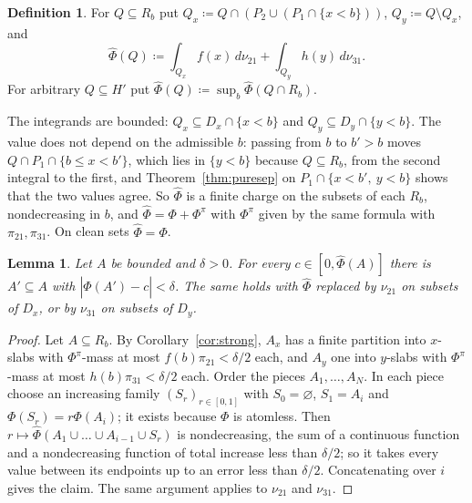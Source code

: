 \documentclass[11pt]{article}
\newtheorem{lemma}[theorem]{Lemma}
\theoremstyle{definition}\newtheorem{definition}[theorem]{Definition}
\theoremstyle{remark}\newtheorem{remark}[theorem]{Remark}
\newcommand{\Phihat}{\widehat\Phi}
\begin{document}
\begin{definition}\label{def:Phihat}
For $Q\subseteq R_b$ put $Q_x\coloneqq Q\cap(P_2\cup(P_1\cap\{x<b\}))$,
$Q_y\coloneqq Q\setminus Q_x$, and
\[
 \Phihat(Q)\coloneqq\int_{Q_x}f(x)\,d\nu_{21}+\int_{Q_y}h(y)\,d\nu_{31}.
\]
For arbitrary $Q\subseteq H'$ put $\Phihat(Q)\coloneqq\sup_b\Phihat(Q\cap
R_b)$.
\end{definition}

The integrands are bounded: $Q_x\subseteq D_x\cap\{x<b\}$ and $Q_y\subseteq
D_y\cap\{y<b\}$. The value does not depend on the admissible $b$: passing
from $b$ to $b'>b$ moves $Q\cap P_1\cap\{b\le x<b'\}$, which lies in
$\{y<b\}$ because $Q\subseteq R_b$, from the second integral to the first,
and Theorem~\ref{thm:puresep} on $P_1\cap\{x<b',\ y<b\}$ shows that the two
values agree. So $\Phihat$ is a finite charge on the subsets of each $R_b$,
nondecreasing in $b$, and $\Phihat=\Phi+\Phi^\pi$ with $\Phi^\pi$ given by the
same formula with $\pi_{21},\pi_{31}$. On clean sets $\Phihat=\Phi$.

\begin{lemma}\label{lem:ivt}
Let $A$ be bounded and $\delta>0$. For every $c\in[0,\Phihat(A)]$ there is
$A'\subseteq A$ with $|\Phihat(A')-c|<\delta$. The same holds with
$\Phihat$ replaced by $\nu_{21}$ on subsets of $D_x$, or by $\nu_{31}$ on
subsets of $D_y$.
\end{lemma}
\begin{proof}
Let $A\subseteq R_b$. By Corollary~\ref{cor:strong}, $A_x$ has a finite
partition into $x$-slabs with $\Phi^\pi$-mass at most $f(b)\pi_{21}<\delta/2$
each, and $A_y$ one into $y$-slabs with $\Phi^\pi$-mass at most
$h(b)\pi_{31}<\delta/2$ each. Order the pieces $A_1,\dots,A_N$. In each piece
choose an increasing family $(S_r)_{r\in[0,1]}$ with $S_0=\varnothing$,
$S_1=A_i$ and $\Phi(S_r)=r\Phi(A_i)$; it exists because $\Phi$ is atomless.
Then $r\mapsto\Phihat(A_1\cup\dots\cup A_{i-1}\cup S_r)$ is nondecreasing, the
sum of a continuous function and a nondecreasing function of total increase
less than $\delta/2$; so it takes every value between its endpoints up to
an error less than $\delta/2$. Concatenating over $i$ gives the claim. The
same argument applies to $\nu_{21}$ and $\nu_{31}$.
\end{proof}
\end{document}
